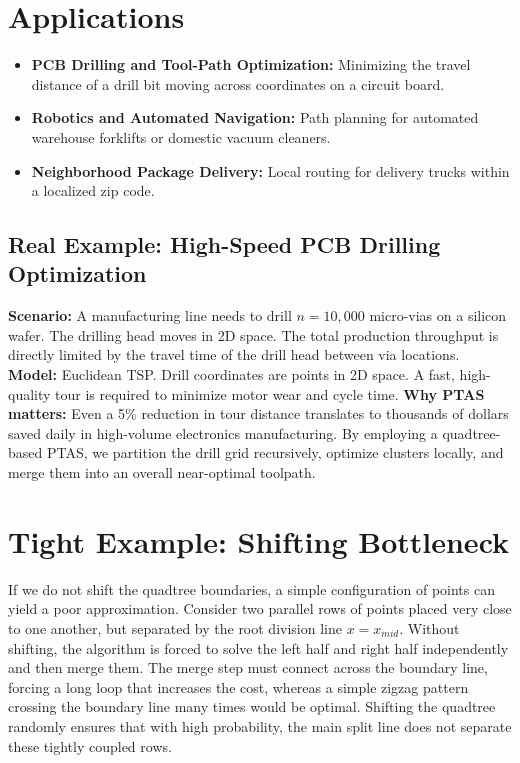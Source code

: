\documentclass[11pt,oneside]{book}
\begin{document}
\section{Applications}
\begin{itemize}
    \item \textbf{PCB Drilling and Tool-Path Optimization:} Minimizing the travel distance of a drill bit moving across coordinates on a circuit board.
    \item \textbf{Robotics and Automated Navigation:} Path planning for automated warehouse forklifts or domestic vacuum cleaners.
    \item \textbf{Neighborhood Package Delivery:} Local routing for delivery trucks within a localized zip code.
\end{itemize}

\subsection*{Real Example: High-Speed PCB Drilling Optimization}
\textbf{Scenario:} A manufacturing line needs to drill $n = 10,000$ micro-vias on a silicon wafer. The drilling head moves in 2D space. The total production throughput is directly limited by the travel time of the drill head between via locations.
\textbf{Model:} Euclidean TSP. Drill coordinates are points in 2D space. A fast, high-quality tour is required to minimize motor wear and cycle time.
\textbf{Why PTAS matters:} Even a 5\% reduction in tour distance translates to thousands of dollars saved daily in high-volume electronics manufacturing. By employing a quadtree-based PTAS, we partition the drill grid recursively, optimize clusters locally, and merge them into an overall near-optimal toolpath.

\section{Tight Example: Shifting Bottleneck}
If we do not shift the quadtree boundaries, a simple configuration of points can yield a poor approximation. Consider two parallel rows of points placed very close to one another, but separated by the root division line $x = x_{mid}$. Without shifting, the algorithm is forced to solve the left half and right half independently and then merge them. The merge step must connect across the boundary line, forcing a long loop that increases the cost, whereas a simple zigzag pattern crossing the boundary line many times would be optimal. Shifting the quadtree randomly ensures that with high probability, the main split line does not separate these tightly coupled rows.
\end{document}
